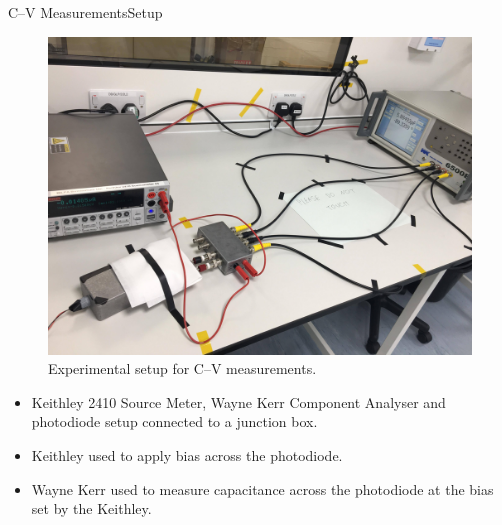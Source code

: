 \documentclass{beamer}
\begin{document}
    \begin{frame}{C--V Measurements}{Setup}
        \begin{minipage}{0.55\linewidth}
        \begin{figure}
            \centering
            \includegraphics[width = \linewidth]{CVSetup.jpg}
            \caption{Experimental setup for C--V measurements.}
        \end{figure}
        \end{minipage}%
        \begin{minipage}{0.45\linewidth}
        \begin{itemize}
            \item Keithley 2410 Source Meter, Wayne Kerr Component Analyser and photodiode setup connected to a junction box.
            \item Keithley used to apply bias across the photodiode.
            \item Wayne Kerr used to measure capacitance across the photodiode at the bias set by the Keithley.
        \end{itemize}
        \end{minipage}
    \end{frame}
    
\end{document}
